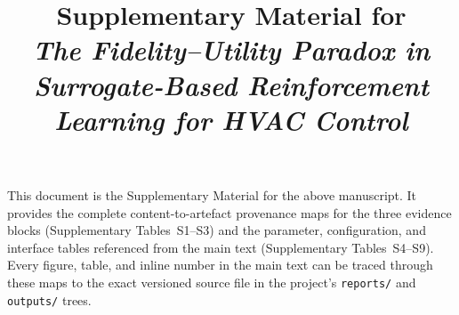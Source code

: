 \documentclass[11pt,a4paper]{article}
\title{Supplementary Material for\\[2pt]
\emph{The Fidelity--Utility Paradox in Surrogate-Based
Reinforcement Learning for HVAC Control}}
\author{}
\date{}
\renewcommand{\thetable}{S\arabic{table}}
\begin{document}
\maketitle

\noindent This document is the Supplementary Material for the above manuscript. It
provides the complete content-to-artefact provenance maps for the three evidence
blocks (Supplementary Tables~S1--S3) and the parameter, configuration, and
interface tables referenced from the main text (Supplementary Tables~S4--S9).
Every figure, table, and inline number in the main text can be traced through these
maps to the exact versioned source file in the project's \texttt{reports/} and
\texttt{outputs/} trees.

\renewcommand{\thetable}{S\arabic{table}}
\setcounter{table}{0}

\footnotesize
\end{document}
